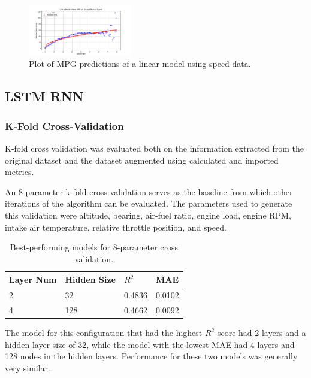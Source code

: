 \documentclass[letterpaper]{article}
\begin{document}
\begin{figure}[htbp]
    \centering
    \includegraphics[width=0.4\textwidth]{figures/speed_vs_mpg_linear_model.png}
    \caption{Plot of MPG predictions of a linear model using speed data.}
    \label{fig:speedvsmpglinear}
\end{figure}


\subsection*{LSTM RNN}

\subsubsection*{K-Fold Cross-Validation}

K-fold cross validation was evaluated both on the information extracted 
from the original dataset and the dataset augmented using calculated and 
imported metrics.

An 8-parameter k-fold cross-validation serves as the baseline from which 
other iterations of the algorithm can be evaluated. The parameters used to 
generate this validation were altitude, bearing, air-fuel ratio, engine 
load, engine RPM, intake air temperature, relative throttle position, and 
speed.

\begin{table}[]
    \centering
    \small
    \begin{tabular}{|l|l|l|l|}
        \hline
        \textbf{Layer Num} & \textbf{Hidden Size} & \textbf{$R^{2}$} & \textbf{MAE} \\
        \hline
        2                  & 32                   & 0.4836      & 0.0102       \\
        4                  & 128                  & 0.4662      & 0.0092       \\
        \hline
    \end{tabular}
    \caption{Best-performing models for 8-parameter cross validation.}
    \label{tab:tb1}
\end{table}

The model for this configuration that had the highest $R^{2}$ score had 2 
layers and a hidden layer size of 32, while the model with the lowest MAE 
had 4 layers and 128 nodes in the hidden layers. Performance for these two 
models was generally very similar.
\end{document}
